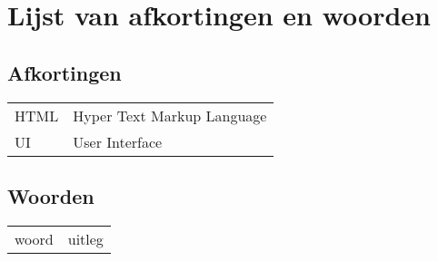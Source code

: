 \chapter*{Lijst van afkortingen en woorden}\label{ch:woorden}
\section*{Afkortingen}
\begin{flushleft}
	\renewcommand{\arraystretch}{1.1}
	\begin{tabularx}{\textwidth}{@{}p{12mm}X@{}}
		HTML\label{html} &  Hyper Text Markup Language\\
		UI\label{ui} & User Interface\\
		
	\end{tabularx}
\end{flushleft}

\section*{Woorden}
\begin{flushleft}
	\renewcommand{\arraystretch}{1.1}
	\begin{tabularx}{\textwidth}{@{}p{12mm}X@{}}
		woord & uitleg \\
	\end{tabularx}
\end{flushleft}